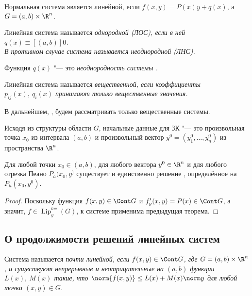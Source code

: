 \begin{restate}
	Нормальная система является линейной, если $ f(x, y) = P(x)y + q(x) $, а $ G = (a, b) \times \R^n $.
\end{restate}

\begin{definition}
    Линейная система  называется \it{однородной (ЛОС)}, если в ней $ q(x) \equiv[(a, b)] 0 $. \\
    В противном случае система называется \it{неоднородной (ЛНС)}.

    Функция $ q(x) $ "--- это \it{неоднородность} системы .
\end{definition}

\begin{definition}
    Линейная система  называется \it{вещественной}, если коэффициенты $ p_{ij}(x), ~ q_i(x) $ принимают только вещественные значения.
\end{definition}

В дальнейшем, \nimp, будем рассматривать только вещественные системы.

Исходя из структуры области $ G $, начальные данные для ЗК "--- это произвольная точка $ x_0 $ из интервала $ (a, b) $ и произвольный вектор $ y^0 = (y_1^0, \dots, y_n^0) $ из пространства $ \R^n $.

\begin{theorem}
    Для любой точки $ x_0 \in (a, b) $, для любого вектора $ y^0 \in \R^n $ и для любого отрезка Пеано $ P_h(x_0, y^) $ существует и единственно решение , определённое на $ P_h(x_0, y^0) $.
\end{theorem}

\begin{proof}
    Поскольку функция $ f(x, y) \in \Cont G $ и $ f_y'(x, y) = P(x) \in \Cont G $, а значит, $ f \in \operatorname{Lip}_y^{loc}(G) $, к системе  применима предыдущая теорема.
\end{proof}

\subsection{О продолжимости решений линейных систем}

\begin{definition}
    Система  называется \it{почти линейной}, если $ f(x, y) \in \Cont G $, где $ G = (a, b) \times \R^n $, и существуют непрерывные и неотрицательные на $ (a, b) $ функции $ L(x), ~ M(x) $ такие, что $ \norm{f(x, y)} \le L(x) + M(x)\norm y $ для любой точки $ (x, y) \in G $.
\end{definition}


